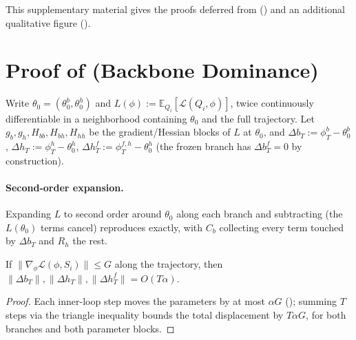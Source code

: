 \clearpage
\maketitlesupplementary

\renewcommand{\thesection}{S\arabic{section}}
\setcounter{section}{0}
\renewcommand{\theequation}{S\arabic{equation}}
\setcounter{equation}{0}
\renewcommand{\thetable}{S\arabic{table}}
\setcounter{table}{0}
\renewcommand{\thefigure}{S\arabic{figure}}
\setcounter{figure}{0}

This supplementary material gives the proofs deferred from  () and an additional qualitative figure ().

\section{Proof of  (Backbone Dominance)}
\label{sec:supp_taylor}

Write $\theta_0=(\theta_0^b,\theta_0^h)$ and $L(\phi):=\mathbb{E}_{Q_i}[\mathcal{L}(Q_i,\phi)]$, twice continuously differentiable in a neighborhood containing $\theta_0$ and the full trajectory. Let $g_b,g_h,H_{bb},H_{bh},H_{hh}$ be the gradient/Hessian blocks of $L$ at $\theta_0$, and $\Delta b_T:=\phi_T^b-\theta_0^b$, $\Delta h_T:=\phi_T^h-\theta_0^h$, $\Delta h_T^f:=\phi_T^{f,h}-\theta_0^h$ (the frozen branch has $\Delta b_T^f=0$ by construction).

\paragraph{Second-order expansion.} Expanding $L$ to second order around $\theta_0$ along each branch and subtracting (the $L(\theta_0)$ terms cancel) reproduces  exactly, with $C_b$ collecting every term touched by $\Delta b_T$ and $R_h$ the rest.

\begin{lemma}
\label{lem:displacement}
If $\|\nabla_\phi\mathcal{L}(\phi,S_i)\|\le G$ along the trajectory, then $\|\Delta b_T\|,\|\Delta h_T\|,\|\Delta h_T^f\|=O(T\alpha)$.
\end{lemma}
\begin{proof}
Each inner-loop step moves the parameters by at most $\alpha G$ (); summing $T$ steps via the triangle inequality bounds the total displacement by $T\alpha G$, for both branches and both parameter blocks.
\end{proof}

